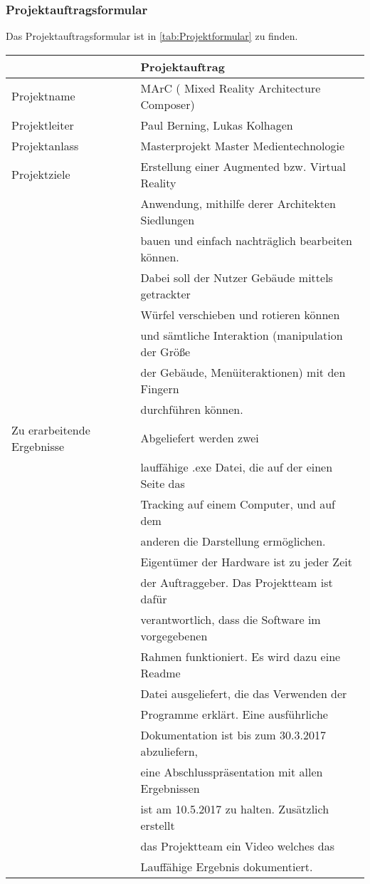 \subsubsection{Projektauftragsformular}
Das Projektauftragsformular ist in \ref{tab:Projektformular} zu finden.
\begin{table}
	\centering
	\begin{tabularx}{\textwidth}{|l|l|}
	\hline
	\Absatzbox{}
	& \textbf{Projektauftrag}\\	
	\hline
	Projektname & MArC ( Mixed Reality Architecture Composer)\\
	\hline
	Projektleiter & Paul Berning, Lukas Kolhagen\\
	\hline
	Projektanlass & Masterprojekt Master Medientechnologie\\
	\hline
	Projektziele & Erstellung einer Augmented bzw. Virtual Reality \\
	&Anwendung, mithilfe derer Architekten Siedlungen\\
	& bauen und einfach nachträglich bearbeiten können.\\
	 &Dabei soll der Nutzer Gebäude mittels getrackter\\
	& Würfel verschieben und rotieren können \\
	&und sämtliche Interaktion (manipulation der Größe\\ 
	& der Gebäude, Menüiteraktionen) mit den Fingern \\
	&durchführen können.\\
	\hline
	Zu erarbeitende Ergebnisse & Abgeliefert werden zwei \\
	&lauffähige .exe Datei, die auf der einen Seite das\\
	&Tracking auf einem Computer, und auf dem \\
	&anderen die Darstellung ermöglichen. \\
	&Eigentümer der Hardware ist zu jeder Zeit\\
	&der Auftraggeber. Das Projektteam ist dafür\\
	&verantwortlich, dass die Software im vorgegebenen\\
	&Rahmen funktioniert. Es wird dazu eine Readme \\
	&Datei ausgeliefert, die das Verwenden der\\
	& Programme erklärt. Eine ausführliche \\
	&Dokumentation ist bis zum 30.3.2017 abzuliefern,\\
	& eine Abschlusspräsentation mit allen Ergebnissen\\
	& ist am 10.5.2017 zu halten. Zusätzlich erstellt\\
	 &das Projektteam ein Video welches das\\
	& Lauffähige Ergebnis dokumentiert.\\
	

\end{tabularx}
\end{table}
